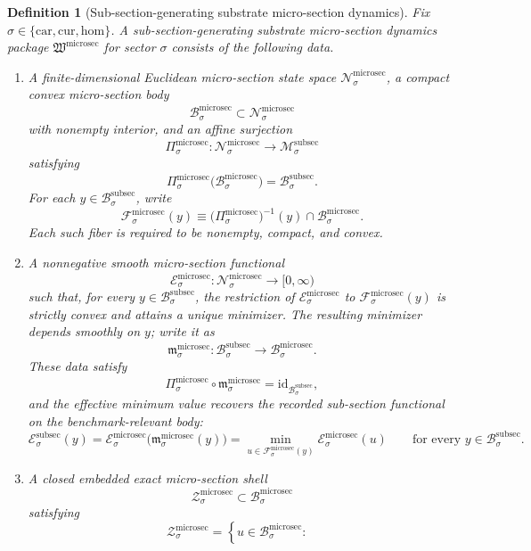 \documentclass[11pt]{article}
\newcommand{\Car}{\mathrm{car}}
\newcommand{\Cur}{\mathrm{cur}}
\newcommand{\Hom}{\mathrm{hom}}
\newcommand{\SubSectionSpace}[1]{\mathcal M_{#1}^{\mathrm{subsec}}}
\newcommand{\SubSectionBody}[1]{\mathcal B_{#1}^{\mathrm{subsec}}}
\newcommand{\SubSectionFunctional}[1]{\mathscr E_{#1}^{\mathrm{subsec}}}
\newcommand{\MicroSectionPackage}{\mathfrak W^{\mathrm{microsec}}}
\newcommand{\MicroSectionSpace}[1]{\mathcal N_{#1}^{\mathrm{microsec}}}
\newcommand{\MicroSectionBody}[1]{\mathcal B_{#1}^{\mathrm{microsec}}}
\newcommand{\MicroSectionProj}[1]{\Pi_{#1}^{\mathrm{microsec}}}
\newcommand{\MicroSectionFiber}[2]{\mathcal F_{#1}^{\mathrm{microsec}}(#2)}
\newcommand{\MicroSectionSubMin}[1]{\mathfrak m_{#1}^{\mathrm{microsec}}}
\newcommand{\MicroSectionFunctional}[1]{\mathscr E_{#1}^{\mathrm{microsec}}}
\newcommand{\MicroSectionShell}[1]{\mathcal Z_{#1}^{\mathrm{microsec}}}
\newtheorem{definition}{Definition}
\begin{document}
\begin{definition}[Sub-section-generating substrate micro-section dynamics]
\label{def:microsec}
Fix \(\sigma\in\{\Car,\Cur,\Hom\}\). A sub-section-generating substrate micro-section dynamics package \(\MicroSectionPackage\) for sector \(\sigma\) consists of the following data.
\begin{enumerate}
    \item A finite-dimensional Euclidean micro-section state space \(\MicroSectionSpace{\sigma}\), a compact convex micro-section body
    \[
    \MicroSectionBody{\sigma}\subset\MicroSectionSpace{\sigma}
    \]
    with nonempty interior, and an affine surjection
    \[
    \MicroSectionProj{\sigma}:\MicroSectionSpace{\sigma}\to\SubSectionSpace{\sigma}
    \]
    satisfying
    \[
    \MicroSectionProj{\sigma}\bigl(\MicroSectionBody{\sigma}\bigr)=\SubSectionBody{\sigma}.
    \]
    For each \(y\in\SubSectionBody{\sigma}\), write
    \[
    \MicroSectionFiber{\sigma}{y}
    \equiv
    \bigl(\MicroSectionProj{\sigma}\bigr)^{-1}(y)\cap\MicroSectionBody{\sigma}.
    \]
    Each such fiber is required to be nonempty, compact, and convex.
    \item A nonnegative smooth micro-section functional
    \[
    \MicroSectionFunctional{\sigma}:\MicroSectionSpace{\sigma}\to[0,\infty)
    \]
    such that, for every \(y\in\SubSectionBody{\sigma}\), the restriction of \(\MicroSectionFunctional{\sigma}\) to \(\MicroSectionFiber{\sigma}{y}\) is strictly convex and attains a unique minimizer. The resulting minimizer depends smoothly on \(y\); write it as
    \[
    \MicroSectionSubMin{\sigma}:\SubSectionBody{\sigma}\to\MicroSectionBody{\sigma}.
    \]
    These data satisfy
    \[
    \MicroSectionProj{\sigma}\circ\MicroSectionSubMin{\sigma}
    =
    \mathrm{id}_{\SubSectionBody{\sigma}},
    \]
    and the effective minimum value recovers the recorded sub-section functional on the benchmark-relevant body:
    \[
    \SubSectionFunctional{\sigma}(y)
    =
    \MicroSectionFunctional{\sigma}\bigl(\MicroSectionSubMin{\sigma}(y)\bigr)
    =
    \min_{u\in\MicroSectionFiber{\sigma}{y}}
    \MicroSectionFunctional{\sigma}(u)
    \qquad
    \text{for every }
    y\in\SubSectionBody{\sigma}.
    \]
    \item A closed embedded exact micro-section shell
    \[
    \MicroSectionShell{\sigma}\subset\MicroSectionBody{\sigma}
    \]
    satisfying
    \[
    \MicroSectionShell{\sigma}
    =
    \left\{
    u\in\MicroSectionBody{\sigma}:
    \begin{array}{l}

\end{array}\]
\end{enumerate}
\end{definition}
\end{document}

